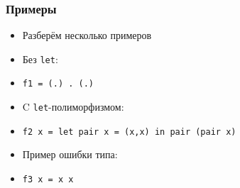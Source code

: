 \documentclass[11pt]{beamer}
\begin{document}
%

\begin{frame}[fragile]
\frametitle{Примеры}
\begin{itemize}
    \item Разберём несколько примеров
    \pause
    \item Без \lstinline|let|:
    \item[] \lstinline|f1 = (.) . (.)|
    \pause
    \item C \lstinline|let|-полиморфизмом:
    \item[] \lstinline|f2 x = let pair x = (x,x) in pair (pair x)|
    \pause
    \item Пример ошибки типа:
    \item[] \lstinline|f3 x = x x|
\end{itemize}
\end{frame}
\end{document}
